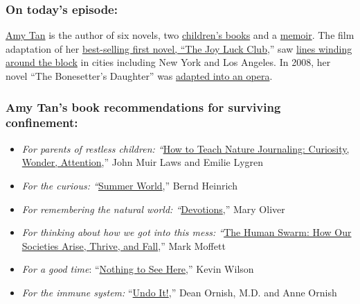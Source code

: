 \hypertarget{on-todays-episode}{%
\subsubsection{\texorpdfstring{\textbf{On today's
episode:}}{On today's episode:}}\label{on-todays-episode}}

\href{http://www.amytan.net/}{Amy Tan} is the author of six novels, two
\href{https://www.nytimes3xbfgragh.onion/1992/11/08/books/childrens-books-girl-overboard.html}{children's
books} and a
\href{https://www.nytimes3xbfgragh.onion/2017/10/16/books/amy-tan-memoir.html}{memoir}.
The film adaptation of her
\href{https://www.nytimes3xbfgragh.onion/1989/03/19/books/the-joy-luck-club.html?searchResultPosition=2}{best-selling
first novel, ``The Joy Luck Club},'' saw
\href{https://www.nytimes3xbfgragh.onion/2018/09/09/movies/joy-luck-club-crazy-rich-asians.html?searchResultPosition=3}{lines
winding around the block} in cities including New York and Los Angeles.
In 2008, her novel ``The Bonesetter's Daughter'' was
\href{https://www.nytimes3xbfgragh.onion/2008/08/31/arts/music/31melv.html}{adapted
into an opera}.

\hypertarget{amy-tans-book-recommendations-for-surviving-confinement}{%
\subsubsection{\texorpdfstring{\textbf{Amy Tan's book recommendations
for surviving
confinement:}}{Amy Tan's book recommendations for surviving confinement:}}\label{amy-tans-book-recommendations-for-surviving-confinement}}

\begin{itemize}
\tightlist
\item
  \emph{For parents of restless children:
  ``}\href{https://heydaybooks.com/book/how-to-teach-nature-journaling/}{How
  to Teach Nature Journaling: Curiosity, Wonder, Attention},'' John Muir
  Laws and Emilie Lygren
\end{itemize}

\begin{itemize}
\item
  \emph{For the curious:
  ``}\href{https://www.nytimes3xbfgragh.onion/2009/05/31/books/review/Royte-t.html}{Summer
  World},'' Bernd Heinrich
\item
  \emph{For remembering the natural world:
  ``}\href{https://www.penguinrandomhouse.com/books/536247/devotions-by-mary-oliver/}{Devotions},''
  Mary Oliver
\item
  \emph{For thinking about how we got into this mess:
  ``}\href{https://www.basicbooks.com/titles/mark-w-moffett/the-human-swarm/9781541617292/}{The
  Human Swarm: How Our Societies Arise, Thrive, and Fall},'' Mark
  Moffett
\item
  \emph{For a good time}:
  ``\href{https://www.harpercollins.com/9780062913463/nothing-to-see-here/}{Nothing
  to See Here},'' Kevin Wilson
\item
  \emph{For the immune system:}
  ``\href{https://www.penguinrandomhouse.com/books/572963/undo-it-by-dean-ornish-md-and-anne-ornish/}{Undo
  It!},'' Dean Ornish, M.D. and Anne Ornish
\end{itemize}

